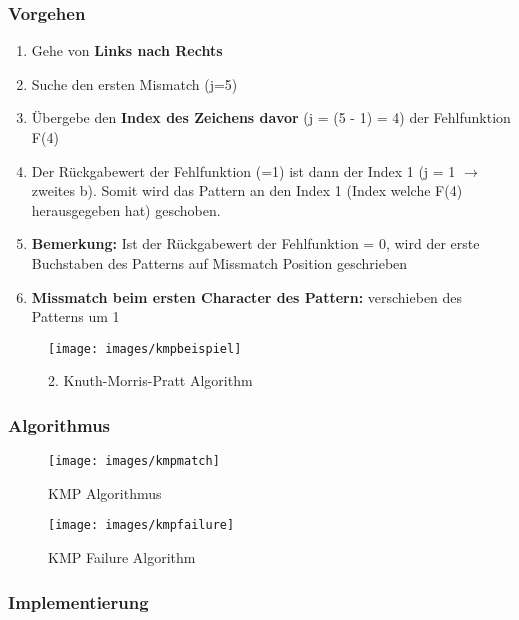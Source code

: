 \subsubsection{Vorgehen}
\begin{enumerate}
	\item Gehe von \textbf{Links nach Rechts}
	\item Suche den ersten Mismatch (j=5)
	\item Übergebe den \textbf{Index des Zeichens davor} (j = (5 - 1) = 4) der Fehlfunktion F(4)
	\item Der Rückgabewert der Fehlfunktion (=1) ist dann der Index 1 (j = 1 $\rightarrow$ zweites b). Somit wird das Pattern an den Index 1 (Index welche F(4) herausgegeben hat) geschoben.
	\item \textbf{Bemerkung:} Ist der Rückgabewert der Fehlfunktion = 0, wird der erste Buchstaben des Patterns auf Missmatch Position geschrieben
	\item \textbf{Missmatch beim ersten Character des Pattern:} verschieben des Patterns um 1
\end{enumerate}

\begin{figure}[h]
\centering
\texttt{[image: images/kmpbeispiel]}
\caption{2. Knuth-Morris-Pratt Algorithm}
\label{fig:kmpmatchalgorithm}
\end{figure}

\clearpage

\subsubsection{Algorithmus}
\begin{figure}[h!]
	\begin{minipage}[t]{1\textwidth}
		\centering
		\texttt{[image: images/kmpmatch]}
		\caption{KMP Algorithmus}
		\label{fig:kmpalg}
	\end{minipage}
	\begin{minipage}[t]{1\textwidth}
		\centering
		\texttt{[image: images/kmpfailure]}
		\caption{KMP Failure Algorithm}
		\label{fig:kmpfailure}
	\end{minipage}
\end{figure}

\clearpage

\subsubsection{Implementierung}

